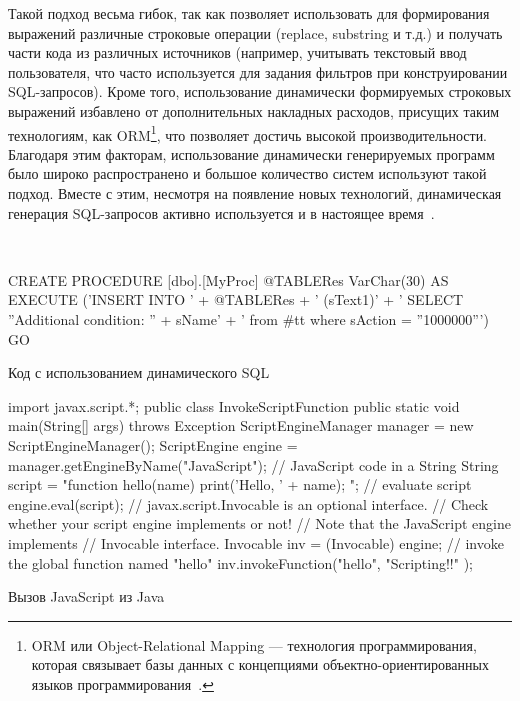 Такой подход весьма гибок, так как позволяет использовать для формирования выражений различные строковые операции (replace, substring и т.д.) и получать части кода из различных источников (например, учитывать текстовый ввод пользователя, что часто используется для задания фильтров при конструировании SQL-запросов). Кроме того, использование динамически формируемых строковых выражений избавлено от  дополнительных накладных расходов, присущих таким технологиям, как ORM\footnote{ORM или Object-Relational Mapping --- технология программирования, которая связывает базы данных с концепциями объектно-ориентированных языков программирования~\cite{ORM}.}, что позволяет достичь высокой производительности. Благодаря этим факторам, использование динамически генерируемых программ было широко распространено и большое количество систем используют такой подход. Вместе с этим, несмотря на появление новых технологий, динамическая генерация SQL-запросов активно используется и в настоящее время~\cite{DSQLInActiveUse}.

\

\begin{listing}
    \begin{pyglist}[language=sql,numbers=left,numbersep=5pt]

CREATE PROCEDURE [dbo].[MyProc]  @TABLERes   VarChar(30)
AS
    EXECUTE ('INSERT INTO ' + @TABLERes + ' (sText1)' +
             ' SELECT ''Additional condition: '' + sName' +
             ' from #tt where sAction = ''1000000''')
GO
    \end{pyglist}
\caption{Код с использованием динамического SQL}
\label{lst:dsql1}
\end{listing} 
 
\begin{listing}
    \begin{pyglist}[language=java,numbers=left,numbersep=5pt]
import javax.script.*;  
public class InvokeScriptFunction {  
    public static void main(String[] args) throws Exception {  
        ScriptEngineManager manager = new ScriptEngineManager();  
        ScriptEngine engine = manager.getEngineByName("JavaScript");  
        // JavaScript code in a String  
        String script = 
            "function hello(name) { print('Hello, ' + name); }";  
        // evaluate script  
        engine.eval(script);  
        // javax.script.Invocable is an optional interface.  
        // Check whether your script engine implements or not!  
        // Note that the JavaScript engine implements
        // Invocable interface.  
        Invocable inv = (Invocable) engine;  
        // invoke the global function named "hello"  
        inv.invokeFunction("hello", "Scripting!!" );  
    }  
}
    \end{pyglist}
\caption{Вызов JavaScript из Java}
\label{lst:JsJava}
\end{listing}


